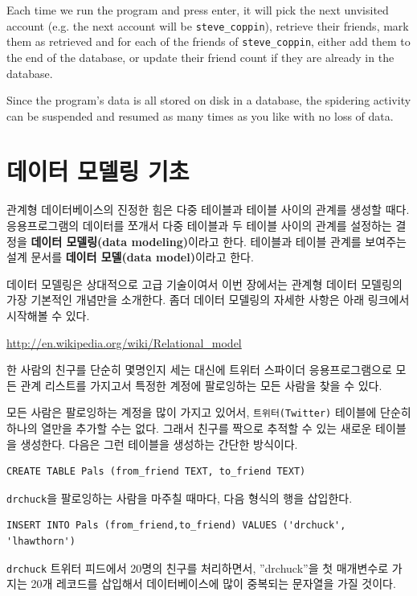 Each time we run the program and press enter, it will pick the next 
unvisited account (e.g. the next account will be \verb"steve_coppin"),
retrieve their friends, mark them as retrieved and for each of the 
friends of \verb"steve_coppin", either add them to the end of the 
database, or update their friend count if they are already in the
database.

Since the program's data is all stored on disk in a database, 
the spidering activity can be suspended and resumed as many times as you 
like with no loss of data.

\section{데이터 모델링 기초}

관계형 데이터베이스의 진정한 힘은 다중 테이블과 테이블 사이의 관계를 생성할 때다.
응용프로그램의 데이터를 쪼개서 다중 테이블과 두 테이블 사이의 관계를 설정하는 결정을 
{\bf 데이터 모델링(data modeling)}이라고 한다. 테이블과 테이블 관계를 보여주는 설계 문서를 
{\bf 데이터 모델(data model)}이라고 한다.

데이터 모델링은 상대적으로 고급 기술이여서 이번 장에서는 관계형 데이터 모델링의 가장 기본적인 개념만을 소개한다.
좀더 데이터 모델링의 자세한 사항은 아래 링크에서 시작해볼 수 있다.

\url{http://en.wikipedia.org/wiki/Relational_model}

한 사람의 친구를 단순히 몇명인지 세는 대신에 트위터 스파이더 응용프로그램으로 모든 관계 리스트를 가지고서 특정한 계정에
팔로잉하는 모든 사람을 찾을 수 있다.

모든 사람은 팔로잉하는 계정을 많이 가지고 있어서, {\tt 트위터(Twitter)} 테이블에 단순히 하나의 열만을 추가할 수는 없다.
그래서 친구를 짝으로 추적할 수 있는 새로운 테이블을 생성한다. 다음은 그런 테이블을 생성하는 간단한 방식이다.

\beforeverb
\begin{verbatim}
CREATE TABLE Pals (from_friend TEXT, to_friend TEXT)
\end{verbatim}
\afterverb
%

{\tt drchuck}을 팔로잉하는 사람을 마주칠 때마다, 다음 형식의 행을 삽입한다.

\beforeverb
\begin{verbatim}
INSERT INTO Pals (from_friend,to_friend) VALUES ('drchuck', 'lhawthorn')
\end{verbatim}
\afterverb
%

{\tt drchuck} 트위터 피드에서 20명의 친구를 처리하면서, ''drchuck''을 첫 매개변수로 가지는 20개 레코드를 삽입해서
데이터베이스에 많이 중복되는 문자열을 가질 것이다.


